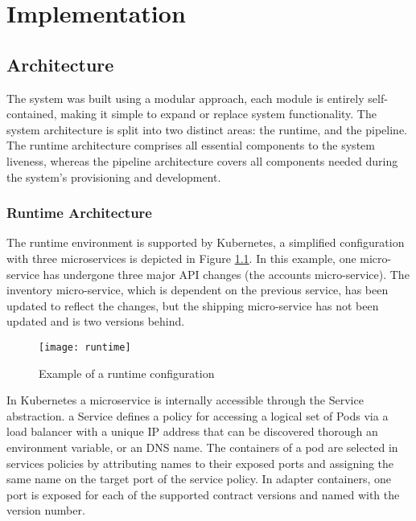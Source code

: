
%

\chapter{Implementation}
\label{cha:implementation}

\section{Architecture} %
\label{sec:architecture}
The system was built using a modular approach,
each module is entirely self-contained, making it simple to expand or replace system functionality.
The system architecture is split into two distinct areas: the runtime, and the pipeline.
The runtime architecture comprises all essential components to the system liveness,
whereas the pipeline architecture covers all components needed during the system's provisioning and development.

\subsection{Runtime Architecture} %
\label{sec:runtime_architecture}

The runtime environment is supported by Kubernetes,
a simplified configuration with three microservices is depicted in Figure \ref{fig:runtime}.
In this example, one micro-service has undergone three major API changes (the accounts micro-service).
The inventory micro-service, which is dependent on the previous service, has been updated to reflect the changes, but the shipping micro-service has not been updated and is two versions behind.

\begin{figure}[htbp]
    \centering
    \texttt{[image: runtime]}
    \caption{Example of a runtime configuration}
    \label{fig:runtime}
\end{figure}

In Kubernetes a microservice is internally accessible through the Service abstraction.
a Service defines a policy for accessing a logical set of Pods via a load balancer with a
unique IP address that can be discovered thorough an environment variable, or an DNS name.
The containers of a pod are selected in services policies by attributing names to their exposed ports and assigning the same name on the target port of the service policy.
In adapter containers, one port is exposed for each of the supported contract versions and named with the version number.

